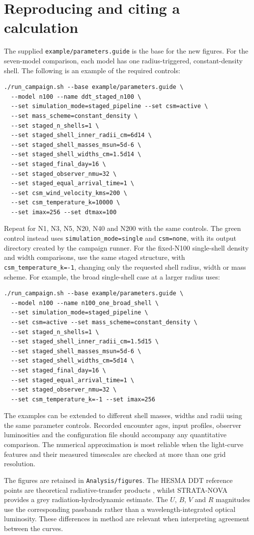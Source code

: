 \documentclass[11pt,a4paper]{article}
\newcommand{\code}[1]{\nolinkurl{#1}}
\begin{document}
\section{Reproducing and citing a calculation}
The supplied \code{example/parameters.guide} is the base for the new figures. For the seven-model comparison, each model has one radius-triggered, constant-density shell. The following is an example of the required controls:
\begin{lstlisting}
./run_campaign.sh --base example/parameters.guide \
  --model n100 --name ddt_staged_n100 \
  --set simulation_mode=staged_pipeline --set csm=active \
  --set mass_scheme=constant_density \
  --set staged_n_shells=1 \
  --set staged_shell_inner_radii_cm=6d14 \
  --set staged_shell_masses_msun=5d-6 \
  --set staged_shell_widths_cm=1.5d14 \
  --set staged_final_day=16 \
  --set staged_observer_nmu=32 \
  --set staged_equal_arrival_time=1 \
  --set csm_wind_velocity_kms=200 \
  --set csm_temperature_k=10000 \
  --set imax=256 --set dtmax=100
\end{lstlisting}
Repeat for N1, N3, N5, N20, N40 and N200 with the same controls. The green control instead uses \code{simulation_mode=single} and \code{csm=none}, with its output directory created by the campaign runner. For the fixed-N100 single-shell density and width comparisons, use the same staged structure, with \code{csm_temperature_k=-1}, changing only the requested shell radius, width or mass scheme. For example, the broad single-shell case at a larger radius uses:
\begin{lstlisting}
./run_campaign.sh --base example/parameters.guide \
  --model n100 --name n100_one_broad_shell \
  --set simulation_mode=staged_pipeline \
  --set csm=active --set mass_scheme=constant_density \
  --set staged_n_shells=1 \
  --set staged_shell_inner_radii_cm=1.5d15 \
  --set staged_shell_masses_msun=5d-6 \
  --set staged_shell_widths_cm=5d14 \
  --set staged_final_day=16 \
  --set staged_equal_arrival_time=1 \
  --set staged_observer_nmu=32 \
  --set csm_temperature_k=-1 --set imax=256
\end{lstlisting}
The examples can be extended to different shell masses, widths and radii using the same parameter controls. Recorded encounter ages, input profiles, observer luminosities and the configuration file should accompany any quantitative comparison. The numerical approximation is most reliable when the light-curve features and their measured timescales are checked at more than one grid resolution.

The figures are retained in \code{Analysis/figures}. The HESMA DDT reference points are theoretical radiative-transfer products \cite{sim2013,hesma2017}, whilst STRATA-NOVA provides a grey radiation-hydrodynamic estimate. The $U$, $B$, $V$ and $R$ magnitudes use the corresponding passbands rather than a wavelength-integrated optical luminosity. These differences in method are relevant when interpreting agreement between the curves.
\end{document}
